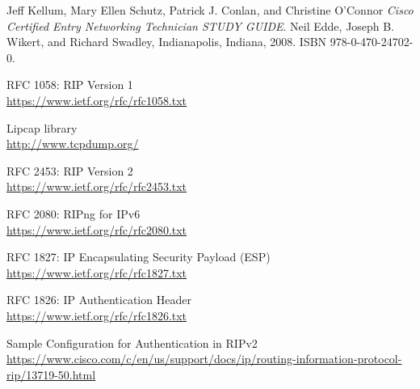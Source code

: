\documentclass[11pt,a4paper]{article}
\begin{document}
\pagebreak

\begin{thebibliography}{9}
Jeff Kellum, Mary Ellen Schutz, Patrick J. Conlan, and Christine O'Connor
\textit{Cisco Certified Entry Networking Technician STUDY GUIDE}.  
Neil Edde, Joseph B. Wikert, and Richard Swadley, Indianapolis, Indiana, 2008. ISBN 978-0-470-24702-0.
 
RFC 1058:  RIP Version 1
\\\url{https://www.ietf.org/rfc/rfc1058.txt}

Lipcap library
\\\url{http://www.tcpdump.org/}

RFC 2453:  RIP Version 2
\\\url{https://www.ietf.org/rfc/rfc2453.txt}
 
RFC 2080:  RIPng for IPv6
\\\url{https://www.ietf.org/rfc/rfc2080.txt}

RFC 1827: IP Encapsulating Security Payload (ESP)
\\\url{https://www.ietf.org/rfc/rfc1827.txt}

RFC 1826: IP Authentication Header
\\\url{https://www.ietf.org/rfc/rfc1826.txt}

Sample Configuration for Authentication in RIPv2
\\\url{https://www.cisco.com/c/en/us/support/docs/ip/routing-information-protocol-rip/13719-50.html}

\end{thebibliography}
\end{document}
